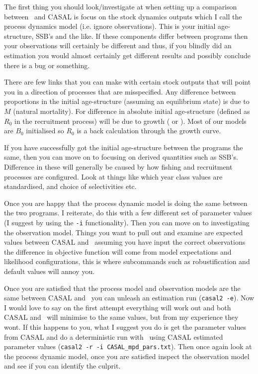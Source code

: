 The first thing you should look/investigate at when setting up a comparison between \CNAME\ and CASAL is focus on the stock dynamics outputs which I call the process dynamics model (i.e. ignore observations). This is your initial age-structure, SSB's and the like. If these components differ between programs then your observations will certainly be different and thus, if you blindly did an estimation you would almost certainly get different results and possibly conclude there is a bug or something.


There are few links that you can make with certain stock outputs that will point you in a direction of processes that are misspecified. Any difference between proportions in the initial age-structure (assuming an equilibrium state) is due to $M$ (natural mortality). For difference in absolute initial age-structure (defined as $R_0$ in the recruitment process) will be due to growth ( or ). Most of our models are $B_0$ initialised so $R_0$ is a back calculation through the growth curve.


If you have successfully got the initial age-structure between the programs the same, then you can move on to focusing on derived quantities such as SSB's. Difference in these will generally be caused by how fishing and recruitment processes are configured. Look at things like which year class values are standardised, and choice of selectivities etc.


Once you are happy that the process dynamic model is doing the same between the two programs. I reiterate, do this with a few different set of parameter values (I suggest by using the \texttt{-i} functionality). Then you can move on to investigating the observation model. Things you want to pull out and examine are expected values between CASAL and \CNAME\ assuming you have input the correct observations the difference in objective function will come from model expectations and likelihood configurations, this is where subcommands such as robustification and default values will annoy you.


Once you are satisfied that the process model and observation models are the same between CASAL and \CNAME\ you can unleash an estimation run (\texttt{casal2 -e}). Now I would love to say on the first attempt everything will work out and both CASAL and \CNAME\ will minimise to the same values, but from my experience they wont. If this happens to you, what I suggest you do is get the parameter values from CASAL and do a deterministic run with \CNAME\ using CASAL estimated parameter values (\texttt{casal2 -r -i CASAL\_mpd\_pars.txt}). Then once again look at the process dynamic model, once you are satisfied inspect the observation model and see if you can identify the culprit.


